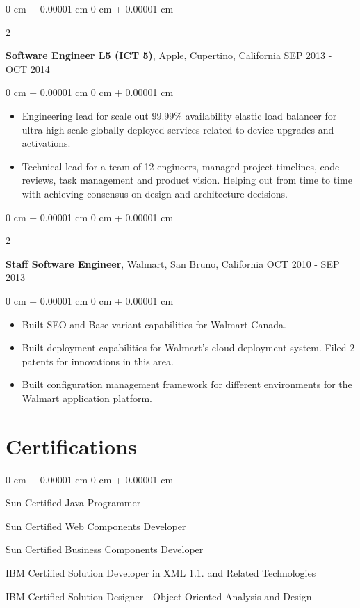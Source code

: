 \documentclass[10pt, letterpaper]{article}
\newenvironment{highlights}{
    \begin{itemize}[
        topsep=0.10 cm,
        parsep=0.10 cm,
        partopsep=0pt,
        itemsep=0pt,
        leftmargin=0 cm + 10pt
    ]
}{
    \end{itemize}
} %
\newenvironment{onecolentry}{
    \begin{adjustwidth}{
        0 cm + 0.00001 cm
    }{
        0 cm + 0.00001 cm
    }
}{
    \end{adjustwidth}
} %
\newenvironment{twocolentry}[2][]{
    \onecolentry
    \def\secondColumn{#2}
    \setcolumnwidth{\fill, 4.5 cm}
    \begin{paracol}{2}
}{
    \switchcolumn \raggedleft \secondColumn
    \end{paracol}
    \endonecolentry
} %
\begin{document}
        \vspace{1.60 cm}
        \begin{twocolentry}{
            SEP 2013 - OCT 2014
        }
            \textbf{Software Engineer L5 (ICT 5)}, Apple, Cupertino, California\end{twocolentry}
        \vspace{0.10 cm}
        \begin{onecolentry}
            \begin{highlights}
                \item Engineering lead for scale out 99.99\% availability elastic load balancer for ultra high scale globally deployed services related to device upgrades and activations.
                \item Technical lead for a team of 12 engineers, managed project timelines, code reviews, task management and product vision. Helping out from time to time with achieving consensus on design and architecture decisions.
            \end{highlights}
        \end{onecolentry}

        \vspace{0.20 cm}
        \begin{twocolentry}{
            OCT 2010 - SEP 2013
        }
            \textbf{Staff Software Engineer}, Walmart, San Bruno, California\end{twocolentry}
        \vspace{0.10 cm}
        \begin{onecolentry}
            \begin{highlights}
                \item Built SEO and Base variant capabilities for Walmart Canada.
                \item Built deployment capabilities for Walmart’s cloud deployment system. Filed 2 patents for innovations in this area.
                \item Built configuration management framework for different environments for the Walmart application platform.
            \end{highlights}
        \end{onecolentry}

        \section{Certifications}
        \vspace{0.10 cm}
        \begin{onecolentry}
            \item Sun Certified Java Programmer
            \item Sun Certified Web Components Developer
            \item Sun Certified Business Components Developer
            \item IBM Certified Solution Developer in XML 1.1. and Related Technologies
            \item IBM Certified Solution Designer - Object Oriented Analysis and Design
        \end{onecolentry}
\end{document}

